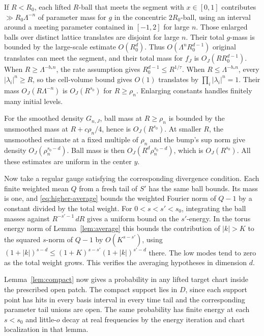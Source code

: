\documentclass[11pt,a4paper,reqno]{amsart}
\theoremstyle{definition}
\theoremstyle{remark}
\numberwithin{equation}{section}
\begin{document}
If \(R<R_0\), each lifted \(R\)-ball that meets the segment with \(x\in[0,1]\) contributes \(\gg R_0\Lambda^{-n}\) of parameter mass for \(g\) in the concentric \(2R_0\)-ball, using an interval around a meeting parameter contained in \([-1,2]\) for large \(n\). Those enlarged balls over distinct lattice translates are disjoint for large \(n\). Their total \(g\)-mass is bounded by the large-scale estimate \(O(R_0^d)\). Thus \(O(\Lambda^nR_0^{d-1})\) original translates can meet the segment, and their total mass for \(f_J\) is \(O_J(RR_0^{d-1})\). When \(R\ge\Lambda^{-b_*n}\), the rate assumption gives \(R_0^{d-1}\le R^{1/\tau}\). When \(R\le\Lambda^{-b_*n}\), every \(|\lambda_i|^n\ge R\), so the cell-volume bound gives \(O(1)\) translates by \(\prod_i|\lambda_i|^n=1\). Their mass \(O_J(R\Lambda^{-n})\) is \(O_J(R^{s_0})\) for \(R\ge\rho_n\). Enlarging constants handles finitely many initial levels.

For the smoothed density \(G_{n,J}\), ball mass at \(R\ge\rho_n\) is bounded by the unsmoothed mass at \(R+c\rho_n/4\), hence is \(O_J(R^{s_0})\). At smaller \(R\), the unsmoothed estimate at a fixed multiple of \(\rho_n\) and the bump's sup norm give density \(O_J(\rho_n^{s_0-d})\). Ball mass is then \(O_J(R^d\rho_n^{s_0-d})\), which is \(O_J(R^{s_0})\). All these estimates are uniform in the center \(y\).

Now take a regular gauge satisfying the corresponding divergence condition. Each finite weighted mean \(Q\) from a fresh tail of \(S'\) has the same ball bounds. Its mass is one, and \eqref{eq:higher-average} bounds the weighted Fourier norm of \(Q-1\) by a constant divided by the total weight. For \(0<s<s'<s_0\), integrating the ball masses against \(R^{-s'-1}\,dR\) gives a uniform bound on the \(s'\)-energy. In the torus energy norm of Lemma~\ref{lem:average} this bounds the contribution of \(|k|>K\) to the squared \(s\)-norm of \(Q-1\) by \(O(K^{s-s'})\), using \((1+|k|)^{s-d}\le (1+K)^{s-s'}(1+|k|)^{s'-d}\) there. The low modes tend to zero as the total weight grows. This verifies the averaging hypotheses in dimension \(d\).

Lemma~\ref{lem:compact} now gives a probability in any lifted target chart inside the prescribed open patch. The compact support lies in \(D\), since each support point has hits in every basis interval in every time tail and the corresponding parameter tail unions are open. The same probability has finite energy at each \(s<s_0\) and little-\(o\) decay at real frequencies by the energy iteration and chart localization in that lemma.
\end{document}
